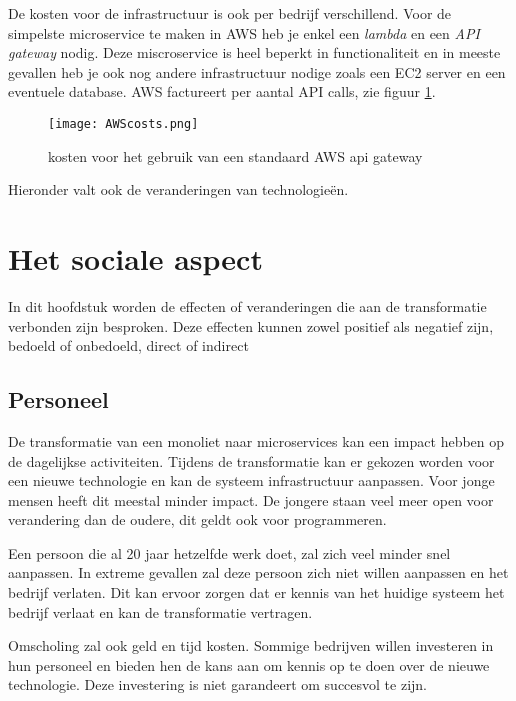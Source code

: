De kosten voor de infrastructuur is ook per bedrijf verschillend. Voor de simpelste microservice te maken in AWS heb je enkel een \emph{lambda} en een \emph{API gateway} nodig. Deze miscroservice is heel beperkt in functionaliteit en in meeste gevallen heb je ook nog andere infrastructuur nodige zoals een EC2 server en een eventuele database. AWS factureert per aantal API calls, zie figuur \ref{awscost}.

\begin{figure}[!htb]
     \centering
    \texttt{[image: AWScosts.png]}    
    \caption{kosten voor het gebruik van een standaard AWS api gateway \label{awscost}}
\end{figure}

Hieronder valt ook de veranderingen van technologieën.

\section{Het sociale aspect}

In dit hoofdstuk worden de effecten of veranderingen die aan de transformatie verbonden zijn besproken. Deze effecten kunnen zowel positief als negatief zijn, bedoeld of onbedoeld, direct of indirect ~\autocite{Clusters2020}

\subsection{Personeel}

De transformatie van een monoliet naar microservices kan een impact hebben op de dagelijkse activiteiten. Tijdens de transformatie kan er gekozen worden voor een nieuwe technologie en kan de systeem infrastructuur aanpassen. Voor jonge mensen heeft dit meestal minder impact. De jongere staan veel meer open voor verandering dan de oudere, dit geldt ook voor programmeren.

Een persoon die al 20 jaar hetzelfde werk doet, zal zich veel minder snel aanpassen. In extreme gevallen zal deze persoon zich niet willen aanpassen en het bedrijf verlaten. Dit kan ervoor zorgen dat er kennis van het huidige systeem het bedrijf verlaat en kan de transformatie vertragen. 

Omscholing zal ook geld en tijd kosten. Sommige bedrijven willen investeren in hun personeel en bieden hen de kans aan om kennis op te doen over de nieuwe technologie. Deze investering is niet garandeert om succesvol te zijn.

